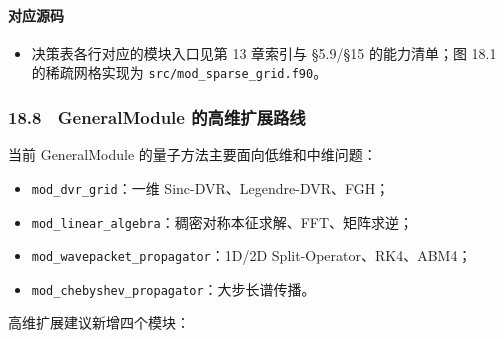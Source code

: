 \documentclass[
]{ctexbook}
\providecommand{\tightlist}{%
  \setlength{\itemsep}{0pt}\setlength{\parskip}{0pt}}
\begin{document}
\hypertarget{ux5bf9ux5e94ux6e90ux7801-86}{%
\paragraph{对应源码}\label{ux5bf9ux5e94ux6e90ux7801-86}}

\begin{itemize}
\tightlist
\item
  决策表各行对应的模块入口见第 13 章索引与 §5.9/§15 的能力清单；图 18.1
  的稀疏网格实现为 \texttt{src/mod\_sparse\_grid.f90}。
\end{itemize}

\hypertarget{generalmodule-ux7684ux9ad8ux7ef4ux6269ux5c55ux8defux7ebf}{%
\subsubsection{18.8　GeneralModule
的高维扩展路线}\label{generalmodule-ux7684ux9ad8ux7ef4ux6269ux5c55ux8defux7ebf}}

当前 GeneralModule 的量子方法主要面向低维和中维问题：

\begin{itemize}
\tightlist
\item
  \texttt{mod\_dvr\_grid}：一维 Sinc-DVR、Legendre-DVR、FGH；
\item
  \texttt{mod\_linear\_algebra}：稠密对称本征求解、FFT、矩阵求逆；
\item
  \texttt{mod\_wavepacket\_propagator}：1D/2D
  Split-Operator、RK4、ABM4；
\item
  \texttt{mod\_chebyshev\_propagator}：大步长谱传播。
\end{itemize}

高维扩展建议新增四个模块：
\end{document}
